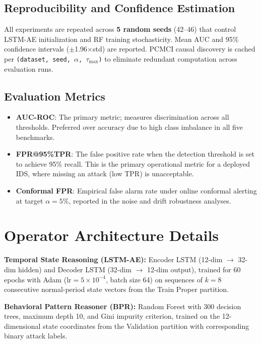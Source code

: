 \subsection{Reproducibility and Confidence Estimation}

All experiments are repeated across \textbf{5 random seeds} (42--46) that control LSTM-AE
initialization and RF training stochasticity. Mean AUC and 95\% confidence intervals
($\pm$1.96$\times$std) are reported. PCMCI causal discovery is cached per
\texttt{(dataset, seed, $\alpha$, $\tau_{\max}$)} to eliminate redundant computation across
evaluation runs.

\subsection{Evaluation Metrics}

\begin{itemize}
\item \textbf{AUC-ROC}: The primary metric; measures discrimination across all thresholds.
  Preferred over accuracy due to high class imbalance in all five benchmarks.
\item \textbf{FPR@95\%TPR}: The false positive rate when the detection threshold is set to
  achieve 95\% recall. This is the primary operational metric for a deployed IDS, where missing
  an attack (low TPR) is unacceptable.
\item \textbf{Conformal FPR}: Empirical false alarm rate under online conformal alerting at
  target $\alpha = 5\%$, reported in the noise and drift robustness analyses.
\end{itemize}


\section{Operator Architecture Details}

\textbf{Temporal State Reasoning (LSTM-AE):} Encoder LSTM (12-dim $\to$ 32-dim hidden) and
Decoder LSTM (32-dim $\to$ 12-dim output), trained for 60 epochs with Adam ($\text{lr} =
5 \times 10^{-4}$, batch size 64) on sequences of $k = 8$ consecutive normal-period state
vectors from the Train Proper partition.

\textbf{Behavioral Pattern Reasoner (BPR):} Random Forest with 300 decision trees, maximum
depth 10, and Gini impurity criterion, trained on the 12-dimensional state coordinates from
the Validation partition with corresponding binary attack labels.

